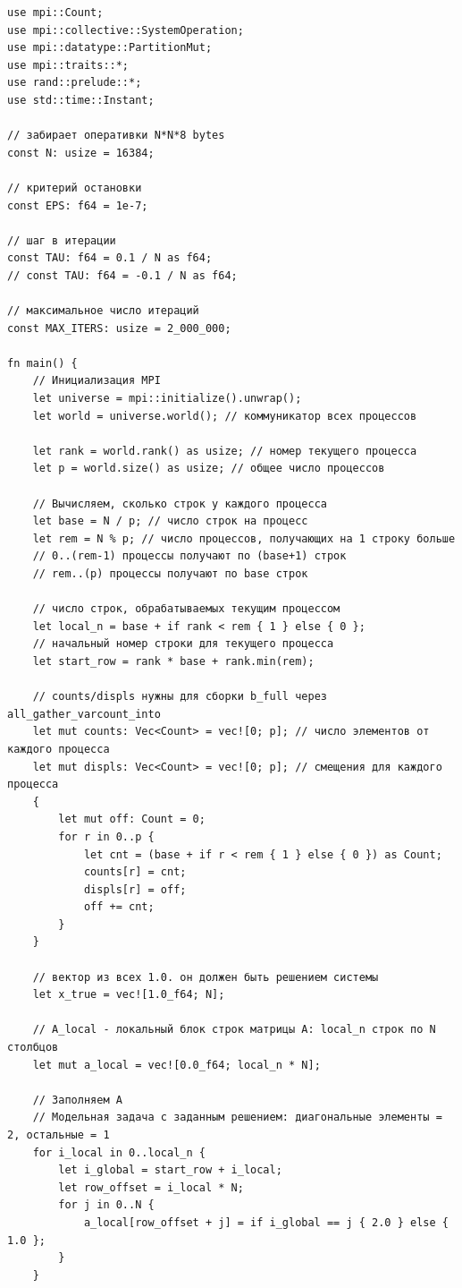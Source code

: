 \documentclass[a4paper, 14pt]{extarticle}
\begin{document}
\begin{lstlisting}[caption={Исходный код программы}, label={lst:source_code}]
use mpi::Count;
use mpi::collective::SystemOperation;
use mpi::datatype::PartitionMut;
use mpi::traits::*;
use rand::prelude::*;
use std::time::Instant;

// забирает оперативки N*N*8 bytes
const N: usize = 16384;

// критерий остановки
const EPS: f64 = 1e-7;

// шаг в итерации
const TAU: f64 = 0.1 / N as f64;
// const TAU: f64 = -0.1 / N as f64;

// максимальное число итераций
const MAX_ITERS: usize = 2_000_000;

fn main() {
    // Инициализация MPI
    let universe = mpi::initialize().unwrap();
    let world = universe.world(); // коммуникатор всех процессов

    let rank = world.rank() as usize; // номер текущего процесса
    let p = world.size() as usize; // общее число процессов

    // Вычисляем, сколько строк у каждого процесса
    let base = N / p; // число строк на процесс
    let rem = N % p; // число процессов, получающих на 1 строку больше
    // 0..(rem-1) процессы получают по (base+1) строк
    // rem..(p) процессы получают по base строк

    // число строк, обрабатываемых текущим процессом
    let local_n = base + if rank < rem { 1 } else { 0 };
    // начальный номер строки для текущего процесса
    let start_row = rank * base + rank.min(rem);

    // counts/displs нужны для сборки b_full через all_gather_varcount_into
    let mut counts: Vec<Count> = vec![0; p]; // число элементов от каждого процесса
    let mut displs: Vec<Count> = vec![0; p]; // смещения для каждого процесса
    {
        let mut off: Count = 0;
        for r in 0..p {
            let cnt = (base + if r < rem { 1 } else { 0 }) as Count;
            counts[r] = cnt;
            displs[r] = off;
            off += cnt;
        }
    }

    // вектор из всех 1.0. он должен быть решением системы
    let x_true = vec![1.0_f64; N];

    // A_local - локальный блок строк матрицы A: local_n строк по N столбцов
    let mut a_local = vec![0.0_f64; local_n * N];

    // Заполняем A
    // Модельная задача с заданным решением: диагональные элементы = 2, остальные = 1
    for i_local in 0..local_n {
        let i_global = start_row + i_local;
        let row_offset = i_local * N;
        for j in 0..N {
            a_local[row_offset + j] = if i_global == j { 2.0 } else { 1.0 };
        }
    }


\end{lstlisting}
\end{document}

